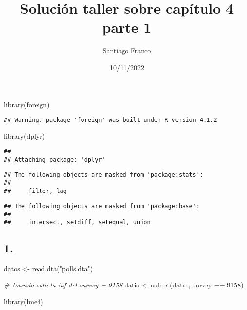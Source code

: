 \documentclass[
]{article}
\title{Solución taller sobre capítulo 4 parte 1}
\author{Santiago Franco}
\date{10/11/2022}
\newenvironment{Shaded}{\begin{snugshade}}{\end{snugshade}}
\newcommand{\CommentTok}[1]{\textcolor[rgb]{0.56,0.35,0.01}{\textit{#1}}}
\newcommand{\DecValTok}[1]{\textcolor[rgb]{0.00,0.00,0.81}{#1}}
\newcommand{\FunctionTok}[1]{\textcolor[rgb]{0.00,0.00,0.00}{#1}}
\newcommand{\NormalTok}[1]{#1}
\newcommand{\OtherTok}[1]{\textcolor[rgb]{0.56,0.35,0.01}{#1}}
\newcommand{\SpecialCharTok}[1]{\textcolor[rgb]{0.00,0.00,0.00}{#1}}
\newcommand{\StringTok}[1]{\textcolor[rgb]{0.31,0.60,0.02}{#1}}
\begin{document}
\maketitle

\begin{Shaded}
\begin{Highlighting}[]
\FunctionTok{library}\NormalTok{(foreign)}
\end{Highlighting}
\end{Shaded}

\begin{verbatim}
## Warning: package 'foreign' was built under R version 4.1.2
\end{verbatim}

\begin{Shaded}
\begin{Highlighting}[]
\FunctionTok{library}\NormalTok{(dplyr)}
\end{Highlighting}
\end{Shaded}

\begin{verbatim}
## 
## Attaching package: 'dplyr'
\end{verbatim}

\begin{verbatim}
## The following objects are masked from 'package:stats':
## 
##     filter, lag
\end{verbatim}

\begin{verbatim}
## The following objects are masked from 'package:base':
## 
##     intersect, setdiff, setequal, union
\end{verbatim}

\hypertarget{section}{%
\subsection{1.}\label{section}}

\begin{Shaded}
\begin{Highlighting}[]
\NormalTok{datos }\OtherTok{\textless{}{-}} \FunctionTok{read.dta}\NormalTok{(}\StringTok{"polls.dta"}\NormalTok{)}

\CommentTok{\# Usando solo la inf del survey = 9158}
\NormalTok{datis }\OtherTok{\textless{}{-}} \FunctionTok{subset}\NormalTok{(datos, survey }\SpecialCharTok{==} \DecValTok{9158}\NormalTok{)}

\FunctionTok{library}\NormalTok{(lme4)}
\end{Highlighting}
\end{Shaded}
\end{document}
